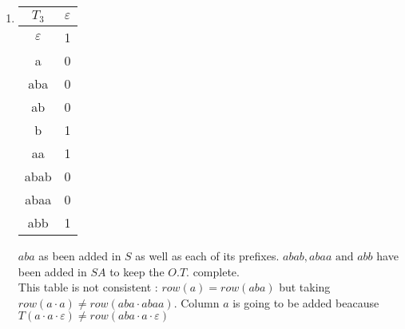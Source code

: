 \begin{enumerate}
  \item \begin{minipage}{0.3\textwidth}
          \begin{tabular}{c||c}
            $T_3$         & $\varepsilon$ \\
            \hline\hline
            $\varepsilon$ & 1             \\
            a             & 0             \\
            aba           & 0             \\
            ab            & 0             \\
            \hline\hline
            b             & 1             \\
            aa            & 1             \\
            abab          & 0             \\
            abaa          & 0             \\
            abb           & 1             \\
          \end{tabular}
        \end{minipage} \quad
        \begin{minipage}{0.5\textwidth}
          $aba$ as been added in $S$ as well as each of its prefixes. $abab, abaa \text{ and } abb$ have been added in $SA$ to keep the $O.T.$ complete. \\
          This table is not consistent : $row(a) = row(aba)$ but taking $row(a \cdot a) \neq row(aba \cdot abaa)$. Column $a$ is going to be added beacause $T(a \cdot a \cdot \varepsilon) \neq row(aba \cdot a \cdot \varepsilon)$
        \end{minipage}


\end{enumerate}
